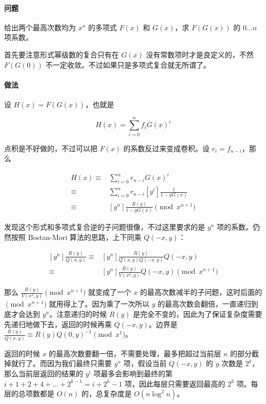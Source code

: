 \paragraph{问题} 给出两个最高次数均为 $x^n$ 的多项式 $F(x)$ 和 $G(x)$，求 $F(G(x))$ 的 $0 \dots n$ 项系数。

首先要注意形式幂级数的复合只有在 $G(x)$ 没有常数项时才是良定义的，不然 $F(G(0))$ 不一定收敛。不过如果只是多项式复合就无所谓了。

\paragraph{做法} 设 $H(x) = F(G(x))$，也就是

$$ H(x) = \sum_{i = 0} ^ n f_i G(x) ^ i $$

点积是不好做的，不过可以把 $F(x)$ 的系数反过来变成卷积。设 $r_i = f_{n - i}$，那么

$$ \begin{aligned}
H(x) \equiv & \sum_{i = 0} ^ n r_{n - i} G(x) ^ i \\
\equiv & \sum_{i = 0} ^ n r_{n - i} \left[ y ^ i \right] \frac 1 {1 - y G(x)} \\
\equiv & \left[ y ^ n \right] \frac {R(y)} {1 - y G(x)} \pmod {x ^ {n + 1}}
\end{aligned} $$

发现这个形式和多项式复合逆的子问题很像，不过这里要求的是 $y^n$ 项的系数。仍然按照 Bostan-Mori 算法的思路，上下同乘 $Q(-x, y)$：

$$ \begin{aligned}
\left[ y ^ n \right] \frac {R(y)} {Q(x, y)} \equiv & \left[ y ^ n \right] \frac {R(y)} {Q(x, y) Q(-x, y)} Q(-x, y) \\
\equiv & \left[ y ^ n \right] \frac {R(y)} {V(x ^ 2, y)} Q(-x, y) \pmod {x ^ {n + 1}}
\end{aligned} $$

那么 $\frac {R(y)} {V(x ^ 2, y)} \pmod {x ^ {n + 1}}$ 就变成了一个 $x$ 的最高次数减半的子问题，这时后面的 $\pmod {x ^ {n + 1}}$ 就用得上了。因为乘了一次所以 $y$ 的最高次数会翻倍，一直递归到底才会达到 $y^n$。注意递归的时候 $R(y)$ 是完全不变的，因此为了保证复杂度需要先递归地做下去，返回的时候再乘 $Q(-x, y)$。边界是 $\frac {R(y)} {Q(x, y)} \equiv R(y) Q(0, y) ^ {-1} \pmod {x ^ 1}$。

返回的时候 $x$ 的最高次数要翻一倍，不需要处理，最多把超过当前层 $n$ 的部分截掉就行了。而因为我们最终只需要 $y^n$ 项，假设当前 $Q(-x, y)$ 的 $y$ 次数是 $2^k$，那么当前层返回的结果的 $y^i$ 项最多会影响到最终的第 $i + 1 + 2 + 4 + \dots + 2^{k - 1} = i + 2^k - 1$ 项，因此每层只需要返回最高的 $2^k$ 项。每层的总项数都是 $O(n)$ 的，总复杂度是 $O(n \log^2 n)$。

